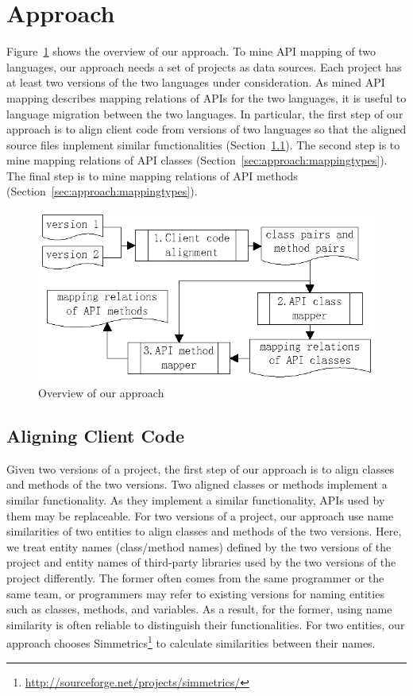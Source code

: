 \section{Approach}
\label{sec:approach}


Figure~\ref{fig:approach} shows the overview of our approach. To
mine API mapping of two languages, our approach needs a set of
projects as data sources. Each project has at least two versions of
the two languages under consideration. As mined API mapping
describes mapping relations of APIs for the two languages, it is
useful to language migration between the two languages. In
particular, the first step of our approach is to align client code
from versions of two languages so that the aligned source files
implement similar functionalities (Section~\ref{sec:approach:acc}).
The second step is to mine mapping relations of API classes
(Section~\ref{sec:approach:mappingtypes}). The final step is to mine
mapping relations of API methods
(Section~\ref{sec:approach:mappingtypes}).
\begin{figure}[t]
\centering
\includegraphics[scale=1,clip]{figure/approach.eps}\vspace*{-3ex}
 \caption{Overview of our approach}\vspace*{-3.5ex}
 \label{fig:approach}
\end{figure}
\subsection{Aligning Client Code}
\label{sec:approach:acc}

Given two versions of a project, the first step of our approach is
to align classes and methods of the two versions. Two aligned
classes or methods implement a similar functionality. As they
implement a similar functionality, APIs used by them may be
replaceable. For two versions of a project, our approach use name
similarities of two entities to align classes and methods of the two
versions. Here, we treat entity names (class/method names) defined
by the two versions of the project and entity names of third-party
libraries used by the two versions of the project differently. The
former often comes from the same programmer or the same team, or
programmers may refer to existing versions for naming entities such
as classes, methods, and variables. As a result, for the former,
using name similarity is often reliable to distinguish their
functionalities. For two entities, our approach chooses
Simmetrics\footnote{\url{http://sourceforge.net/projects/simmetrics/}}
to calculate similarities between their names.


